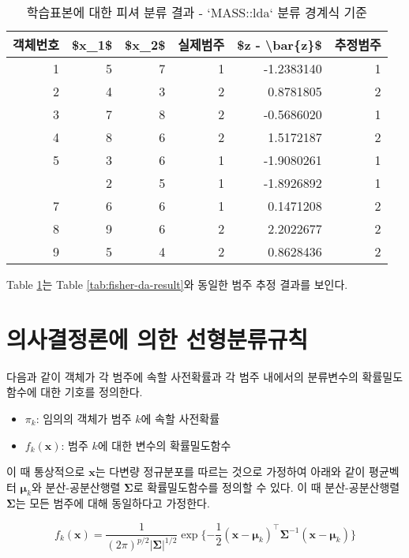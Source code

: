 \documentclass[
]{book}
\providecommand{\tightlist}{%
  \setlength{\itemsep}{0pt}\setlength{\parskip}{0pt}}
\begin{document}
\begin{table}

\caption{\label{tab:fisher-da-result-lda}학습표본에 대한 피셔 분류 결과 - `MASS::lda` 분류 경계식 기준}
\centering
\begin{tabular}[t]{rrrrrr}
\toprule
객체번호 & \$x\_1\$ & \$x\_2\$ & 실제범주 & \$z - \textbackslash{}bar\{z\}\$ & 추정범주\\
\midrule
1 & 5 & 7 & 1 & -1.2383140 & 1\\
2 & 4 & 3 & 2 & 0.8781805 & 2\\
3 & 7 & 8 & 2 & -0.5686020 & 1\\
4 & 8 & 6 & 2 & 1.5172187 & 2\\
5 & 3 & 6 & 1 & -1.9080261 & 1\\
\addlinespace
6 & 2 & 5 & 1 & -1.8926892 & 1\\
7 & 6 & 6 & 1 & 0.1471208 & 2\\
8 & 9 & 6 & 2 & 2.2022677 & 2\\
9 & 5 & 4 & 2 & 0.8628436 & 2\\
\bottomrule
\end{tabular}
\end{table}

Table \ref{tab:fisher-da-result-lda}는 Table \ref{tab:fisher-da-result}와 동일한 범주 추정 결과를 보인다.

\hypertarget{lda}{%
\section{의사결정론에 의한 선형분류규칙}\label{lda}}

다음과 같이 객체가 각 범주에 속할 사전확률과 각 범주 내에서의 분류변수의 확률밀도함수에 대한 기호를 정의한다.

\begin{itemize}
\tightlist
\item
  \(\pi_k\): 임의의 객체가 범주 \(k\)에 속할 사전확률
\item
  \(f_k(\mathbf{x})\): 범주 \(k\)에 대한 변수의 확률밀도함수
\end{itemize}

이 때 통상적으로 \(\mathbf{x}\)는 다변량 정규분포를 따르는 것으로 가정하여 아래와 같이 평균벡터 \(\boldsymbol\mu_k\)와 분산-공분산행렬 \(\boldsymbol\Sigma\)로 확률밀도함수를 정의할 수 있다. 이 때 분산-공분산행렬 \(\boldsymbol\Sigma\)는 모든 범주에 대해 동일하다고 가정한다.

\begin{equation}
f_k(\mathbf{x}) = \frac{1}{(2\pi)^{p/2}|\boldsymbol\Sigma|^{1/2}} \exp \{ -\frac{1}{2} \left(\mathbf{x} - \boldsymbol\mu_k\right)^\top \boldsymbol\Sigma^{-1} \left(\mathbf{x} - \boldsymbol\mu_k\right) \}
\label{eq:mv-gaussian-dist}
\end{equation}
\end{document}
